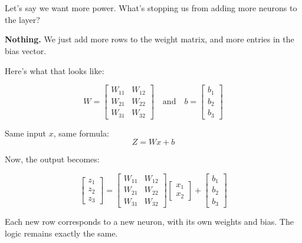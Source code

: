 \documentclass[11pt]{article}
\begin{document}
\section*{}

Let’s say we want more power.  
What’s stopping us from adding more neurons to the layer?

\begin{tcolorbox}[colback=blue!5!white, colframe=blue!80!black, title=Answer:]
\textbf{Nothing.} We just add more rows to the weight matrix, and more entries in the bias vector.
\end{tcolorbox}

\vspace{1em}

Here’s what that looks like:

\[
W =
\begin{bmatrix}
W_{11} & W_{12} \\
W_{21} & W_{22} \\
W_{31} & W_{32}
\end{bmatrix}
\quad \text{and} \quad
b =
\begin{bmatrix}
b_1 \\
b_2 \\
b_3
\end{bmatrix}
\]

Same input $x$, same formula:
\[
Z = W x + b
\]

Now, the output becomes:

\[
\begin{bmatrix}
z_1 \\
z_2 \\
z_3
\end{bmatrix}
=
\begin{bmatrix}
W_{11} & W_{12} \\
W_{21} & W_{22} \\
W_{31} & W_{32}
\end{bmatrix}
\begin{bmatrix}
x_1 \\
x_2
\end{bmatrix}
+
\begin{bmatrix}
b_1 \\
b_2 \\
b_3
\end{bmatrix}
\]

Each new row corresponds to a new neuron, with its own weights and bias.  
The logic remains exactly the same.

\vspace{1em}
\end{document}
